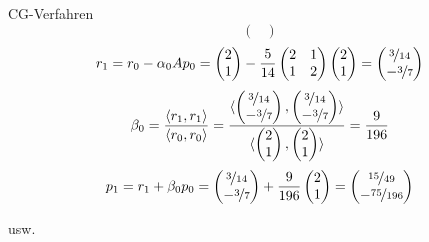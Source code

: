 \begin{example}{CG-Verfahren}
\[\begin{pmatrix}
        \end{pmatrix}
    \]
    \[
        r_{1} = r_0 - \alpha_0 A p_0 =
        \begin{pmatrix}
            2 \\ 1
        \end{pmatrix}
        - \frac{5}{14}
        \begin{pmatrix}
            2 & 1 \\
            1 & 2
        \end{pmatrix}
        \begin{pmatrix}
            2 \\ 1
        \end{pmatrix}
        =
        \begin{pmatrix}
            \nicefrac{3}{14} \\ -\nicefrac{3}{7}
        \end{pmatrix}
    \]
    \[
        \beta_0 = \frac{\langle r_{1}, r_{1} \rangle}{\langle r_0, r_0 \rangle} =
        \frac{\langle
            \begin{pmatrix}
                \nicefrac{3}{14} \\ -\nicefrac{3}{7}
            \end{pmatrix},
            \begin{pmatrix}
                \nicefrac{3}{14} \\ -\nicefrac{3}{7}
            \end{pmatrix}
            \rangle}{\langle
            \begin{pmatrix}
                2 \\ 1
            \end{pmatrix},
            \begin{pmatrix}
                2 \\ 1
            \end{pmatrix} \rangle}
        =
        \frac{9}{196}
    \]
    \[
        p_{1} = r_{1} + \beta_0 p_0 =
        \begin{pmatrix}
            \nicefrac{3}{14} \\ -\nicefrac{3}{7}
        \end{pmatrix}
        + \frac{9}{196}
        \begin{pmatrix}
            2 \\ 1
        \end{pmatrix}
        =
        \begin{pmatrix}
            \nicefrac{15}{49} \\ -\nicefrac{75}{196}
        \end{pmatrix}
    \]

    usw.
\end{example}

